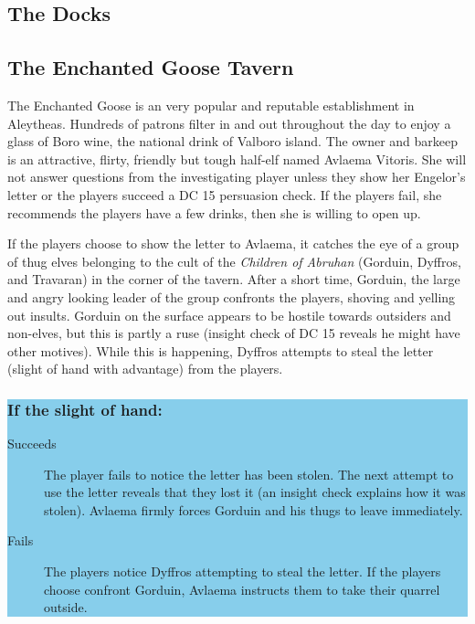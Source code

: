\begin{multicols*}{2}
\subsection{The Docks}

\subsection{The Enchanted Goose Tavern}
The Enchanted Goose is an very popular and reputable establishment in Aleytheas. Hundreds of patrons filter in and out throughout the day to enjoy a glass of Boro wine, the national drink of Valboro island. The owner and barkeep is an attractive, flirty, friendly but tough half-elf named Avlaema Vitoris. She will not answer questions from the investigating player unless they show her Engelor's letter or the players succeed a DC 15 persuasion check. If the players fail, she recommends the players have a few drinks, then she is willing to open up.

If the players choose to show the letter to Avlaema, it catches the eye of a group of thug elves belonging to the cult of the \emph{Children of Abruhan} (Gorduin, Dyffros, and Travaran) in the corner of the tavern. After a short time, Gorduin, the large and angry looking leader of the group confronts the players, shoving and yelling out insults. Gorduin on the surface appears to be hostile towards outsiders and non-elves, but this is partly a ruse (insight check of DC 15 reveals he might have other motives). While this is happening, Dyffros attempts to steal the letter (slight of hand with advantage) from the players.

\colorbox{SkyBlue}{\begin{minipage}{0.4\textwidth}
		\subsubsection*{If the slight of hand:}
		\begin{description}
			\item[Succeeds] The player fails to notice the letter has been stolen. The next attempt to use the letter reveals that they lost it (an insight check explains how it was stolen). Avlaema firmly forces Gorduin and his thugs to leave immediately. 
			\item[Fails] The players notice Dyffros attempting to steal the letter. If the players choose confront Gorduin, Avlaema instructs them to take their quarrel outside.
		\end{description}
\end{minipage}}
\break


\end{multicols*}
